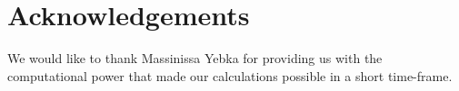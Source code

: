 \documentclass[conference]{IEEEtran}
\begin{document}
\section{Acknowledgements}
We would like to thank Massinissa Yebka for providing us with the computational power that made our calculations possible in a short time-frame.





\end{document}
